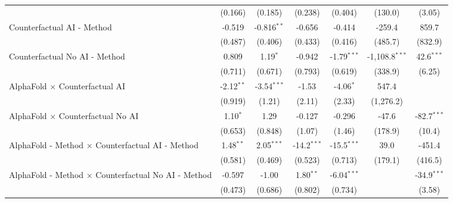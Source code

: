 \begin{tabular}{lcccccc}
                                                              & (0.166)       & (0.185)       & (0.238)       & (0.404)       & (130.0)          & (3.05)\\   
   Counterfactual AI - Method                                 & -0.519        & -0.816$^{**}$ & -0.656        & -0.414        & -259.4           & 859.7\\   
                                                              & (0.487)       & (0.406)       & (0.433)       & (0.416)       & (485.7)          & (832.9)\\   
   Counterfactual No AI - Method                              & 0.809         & 1.19$^{*}$    & -0.942        & -1.79$^{***}$ & -1,108.8$^{***}$ & 42.6$^{***}$\\   
                                                              & (0.711)       & (0.671)       & (0.793)       & (0.619)       & (338.9)          & (6.25)\\   
   AlphaFold $\times$ Counterfactual AI                       & -2.12$^{**}$  & -3.54$^{***}$ & -1.53         & -4.06$^{*}$   & 547.4            &   \\   
                                                              & (0.919)       & (1.21)        & (2.11)        & (2.33)        & (1,276.2)        &   \\   
   AlphaFold $\times$ Counterfactual No AI                    & 1.10$^{*}$    & 1.29          & -0.127        & -0.296        & -47.6            & -82.7$^{***}$\\   
                                                              & (0.653)       & (0.848)       & (1.07)        & (1.46)        & (178.9)          & (10.4)\\   
   AlphaFold - Method $\times$ Counterfactual AI - Method     & 1.48$^{**}$   & 2.05$^{***}$  & -14.2$^{***}$ & -15.5$^{***}$ & 39.0             & -451.4\\   
                                                              & (0.581)       & (0.469)       & (0.523)       & (0.713)       & (179.1)          & (416.5)\\   
   AlphaFold - Method $\times$ Counterfactual No AI - Method  & -0.597        & -1.00         & 1.80$^{**}$   & -6.04$^{***}$ &                  & -34.9$^{***}$\\   
                                                              & (0.473)       & (0.686)       & (0.802)       & (0.734)       &                  & (3.58)\\   

\end{tabular}
